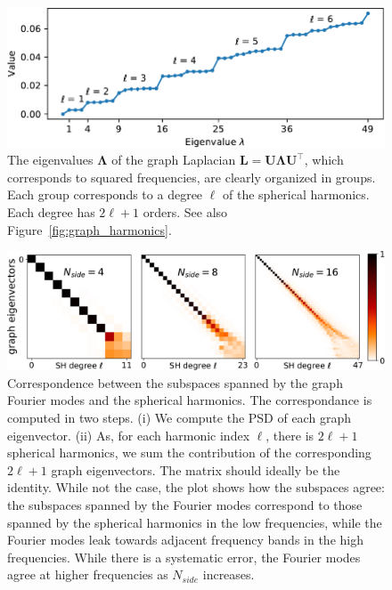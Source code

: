 \documentclass[final,twocolumn,3p,times,sort&compress]{elsarticle}
\newcommand{\figref}[1]{Figure~\ref{fig:#1}}
\renewcommand{\b}[1]{{\bm{#1}}}   %
\newcommand{\1}{\b{1}}              %
\newcommand{\0}{\b{0}}              %
\renewcommand{\L}{\b{L}}
\newcommand{\U}{\b{U}}
\newcommand{\trans}{^\intercal}
\newcommand{\bLambda}{\b{\Lambda}}
\begin{document}
\begin{figure}[t!]
	\centering
	\includegraphics[width=\linewidth]{graph_eigenvalues}
	\caption{The eigenvalues $\bLambda$ of the graph Laplacian $\L = \U \bLambda \U\trans$, which corresponds to squared frequencies, are clearly organized in groups. Each group corresponds to a degree $\ell$ of the spherical harmonics. Each degree has $2\ell + 1$ orders. See also \figref{graph_harmonics}.}
	\label{fig:graph_eigenvalues}
\end{figure}

\begin{figure}[t!]
	\centering
	\includegraphics[width=\linewidth]{subspace_harmonics_eigenvectors_v2}
	\caption{Correspondence between the subspaces spanned by the graph Fourier modes and the spherical harmonics.
		The correspondance is computed in two steps. (i) We compute the PSD of each graph eigenvector.
		(ii) As, for each harmonic index $\ell$, there is $2\ell+1$ spherical harmonics, we sum the contribution of the corresponding $2\ell+1$ graph eigenvectors.
		The matrix should ideally be the identity.
		While not the case, the plot shows how the subspaces agree: the subspaces spanned by the Fourier modes correspond to those spanned by the spherical harmonics in the low frequencies, while the Fourier modes leak towards adjacent frequency bands in the high frequencies.
		While there is a systematic error, the Fourier modes agree at higher frequencies as $N_{side}$ increases.}
		\label{fig:subspace_harmonics_eigenvectors}
\end{figure}
\end{document}
